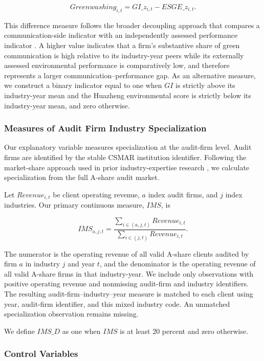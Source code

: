 \documentclass[11pt]{article}
\begin{document}
\[
Greenwashing_{i,t}=GI\_z_{i,t}-ESGE\_z_{i,t}.
\]

This difference measure follows the broader decoupling approach that compares a communication-side indicator with an independently assessed performance indicator \citep{walker2012harm,yu2020greenwashing,lubloy2025quantifying}. 
A higher value indicates that a firm's substantive share of green communication is high relative to its industry-year peers while its externally assessed environmental performance is comparatively low, 
and therefore represents a larger communication--performance gap. 
As an alternative measure, we construct a binary indicator equal to one when \(GI\) is strictly above its industry-year mean and the Huazheng environmental score is strictly below its industry-year mean, and zero otherwise\citep{xu2026deepgreen}. 

\subsubsection{Measures of Audit Firm Industry Specialization}

Our explanatory variable measures specialization at the audit-firm level. Audit firms are identified by the stable CSMAR institution identifier. Following the market-share approach used in prior industry-expertise research \citep{cai2007specialization,krishnan2003expertise}, we calculate specialization from the full A-share audit market. 

Let \(Revenue_{i,t}\) be client operating revenue, \(a\) index audit firms, and \(j\) index industries. Our primary continuous measure, \(IMS\), is

\[
IMS_{a,j,t}=\frac{\sum_{i\in(a,j,t)}Revenue_{i,t}}
{\sum_{i\in(j,t)}Revenue_{i,t}}.
\]

The numerator is the operating revenue of all valid A-share clients audited by firm \(a\) in industry \(j\) and year \(t\), and the denominator is the operating revenue of all valid A-share firms in that industry-year. We include only observations with positive operating revenue and nonmissing audit-firm and industry identifiers. The resulting audit-firm--industry--year measure is matched to each client using year, audit-firm identifier, and this mixed industry code. An unmatched specialization observation remains missing.

We define \(IMS\_D\) as one when \(IMS\) is at least 20 percent and zero otherwise.

\subsubsection{Control Variables}
\end{document}
